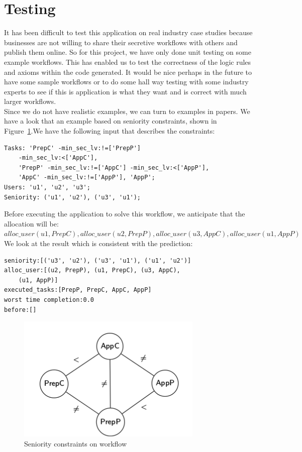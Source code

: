 \documentclass[a4paper]{report}
\begin{document}
\section{Testing}
It has been difficult to test this application on real industry case studies because businesses are not willing to share their secretive workflows with others and publish them online. So for this project, we have only done unit testing on some example workflows. This has enabled us to test the correctness of the logic rules and axioms within the code generated. It would be nice perhaps in the future to have some sample workflows or to do some hall way testing with some industry experts to see if this is application is what they want and is correct with much larger workflows.\\

Since we do not have realistic examples, we can turn to examples in papers. We have a look that an example based on seniority constraints, shown in Figure~\ref{fig:Seniority constraints on workflow}.We have the following input that describes the constraints:
\begin{lstlisting}[frame=single]
Tasks: 'PrepC' -min_sec_lv:!=['PrepP'] 
	-min_sec_lv:<['AppC'], 
	'PrepP' -min_sec_lv:!=['AppC'] -min_sec_lv:<['AppP'], 
	'AppC' -min_sec_lv:!=['AppP'], 'AppP';
Users: 'u1', 'u2', 'u3';
Seniority: ('u1', 'u2'), ('u3', 'u1');
\end{lstlisting}

Before executing the application to solve this workflow, we anticipate that the allocation will be:\\
$alloc\_user(u1, PrepC), alloc\_user(u2, PrepP), alloc\_user(u3, AppC), alloc\_user(u1, AppP)$\\

We look at the result which is consistent with the prediction:
\begin{lstlisting}[frame=single]
seniority:[('u3', 'u2'), ('u3', 'u1'), ('u1', 'u2')]
alloc_user:[(u2, PrepP), (u1, PrepC), (u3, AppC), 
	(u1, AppP)]
executed_tasks:[PrepP, PrepC, AppC, AppP]
worst time completion:0.0
before:[]
\end{lstlisting}

\begin{figure}
\center
\includegraphics[scale=0.75]{example_benchmark.png}
\caption{Seniority constraints on workflow}
\label{fig:Seniority constraints on workflow}
\end{figure}
\end{document}
